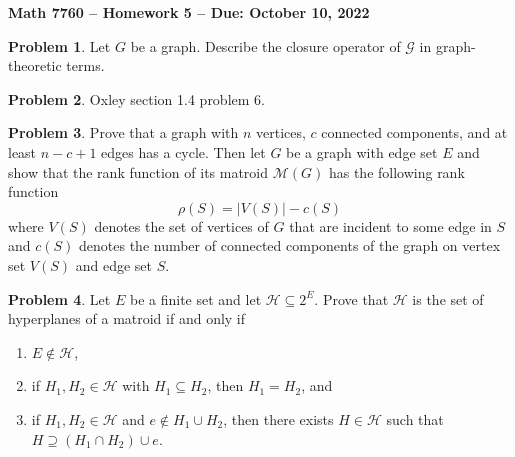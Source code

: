 \documentclass[letterpaper,11pt]{amsart}
\theoremstyle{plain}
\theoremstyle{definition}
\newtheorem{pr}{Problem}
\theoremstyle{remark}
\begin{document}
\Large

\begin{center}
{\bf Math 7760 -- Homework  5 --  Due:  October 10, 2022}
\end{center}

\normalsize


\bigskip


\bigskip

\begin{pr}
    Let $G$ be a graph. Describe the closure operator of $\mathcal{G}$ in graph-theoretic terms.
\end{pr}

\begin{pr}
    Oxley section 1.4 problem 6.
\end{pr}

\bigskip

\bigskip

\begin{pr}
    Prove that a graph with $n$ vertices, $c$ connected components, and at least $n - c + 1$ edges has a cycle.
    Then let $G$ be a graph with edge set $E$ and show that the rank function of its matroid $\mathcal{M}(G)$
    has the following rank function
    \[
        \rho(S) = |V(S)| - c(S)
    \]
    where $V(S)$ denotes the set of vertices of $G$ that are incident to some edge in $S$ and $c(S)$ denotes the number of connected components of the graph on vertex set $V(S)$ and edge set $S$.
\end{pr}

\begin{pr}
    Let $E$ be a finite set and let $\mathcal{H} \subseteq 2^E$.
    Prove that $\mathcal{H}$ is the set of hyperplanes of a matroid if and only if
    \begin{enumerate}
        \item $E \notin \mathcal{H}$,
        \item if $H_1,H_2 \in \mathcal{H}$ with $H_1 \subseteq H_2$, then $H_1 = H_2$, and
        \item if $H_1,H_2 \in \mathcal{H}$ and $e \notin H_1 \cup H_2$, then there exists $H \in \mathcal{H}$
        such that $H \supseteq (H_1 \cap H_2) \cup e$.
    \end{enumerate}
\end{pr}
\end{document}
